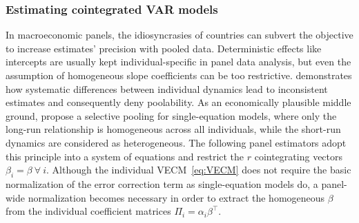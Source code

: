 \subsubsection{Estimating cointegrated VAR models}
In macroeconomic panels, the idiosyncrasies of countries can subvert the objective to increase estimates' precision with pooled data. Deterministic effects like intercepts are usually kept individual-specific in panel data analysis, but even the assumption of homogeneous slope coefficients can be too restrictive. \citet{PesaranSmith1995} demonstrates how systematic differences between individual dynamics lead to inconsistent estimates and consequently deny poolability. As an economically plausible middle ground, \citet{PesaranEtAl1999} propose a selective pooling for single-equation models, where only the long-run relationship is homogeneous across all individuals, while the short-run dynamics are considered as heterogeneous. The following panel estimators adopt this principle into a system of equations and restrict the $ r $ cointegrating vectors $ \beta_i = \beta \ \forall \ i $. Although the individual VECM~\eqref{eq:VECM} does not require the basic normalization of the error correction term as single-equation models do, a panel-wide normalization becomes necessary in order to extract the homogeneous $ \beta $ from the individual coefficient matrices $ \Pi_i = \alpha_i \beta^\top $.


